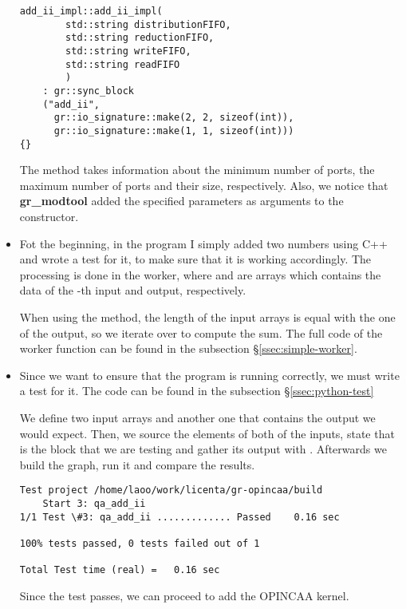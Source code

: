 \begin{itemize}
		\begin{minipage}{\linewidth}
		\begin{lstlisting}
add_ii_impl::add_ii_impl(
		std::string distributionFIFO,                                           
		std::string reductionFIFO,                                              
		std::string writeFIFO,                                                  
		std::string readFIFO          
		)                                                
	: gr::sync_block
	("add_ii",                                               
	  gr::io_signature::make(2, 2, sizeof(int)),                           
	  gr::io_signature::make(1, 1, sizeof(int)))                           
{} 
		\end{lstlisting}
	\end{minipage}

		The  method takes information about the minimum
		number of ports, the maximum number of ports and their size,
		respectively. Also, we notice that \textbf{gr\_modtool} added the specified 
		parameters as arguments to the constructor.


	\item Fot the beginning, in the program I simply added two numbers using C++
		and wrote a test for it, to make sure that it is working accordingly. The
		processing is done in the worker, where  and
		 are arrays which contains the data of the
		-th input and output, respectively.

		When using the  method, the length of the input arrays is
		equal with the one of the output, so we iterate over
		 to compute the sum. The full code of the worker 
		function can be found in the subsection \S\ref{ssec:simple-worker}.
	
	
	\item Since we want to ensure that the program is running correctly, we must 
		write a test for it. The code can be found in the subsection \S\ref{ssec:python-test}
	
		We define two input arrays and another one that contains the output we would 
		expect. Then, we source the elements of both of the inputs, state that 
		 is the block that we are testing and gather its output 
		with . Afterwards we build the graph, run it 
		and compare the results.

		\begin{lstlisting}
Test project /home/laoo/work/licenta/gr-opincaa/build
    Start 3: qa_add_ii
1/1 Test \#3: qa_add_ii ............. Passed    0.16 sec

100% tests passed, 0 tests failed out of 1

Total Test time (real) =   0.16 sec
		\end{lstlisting}

		Since the test passes, we can proceed to add the OPINCAA kernel.
\end{itemize}
